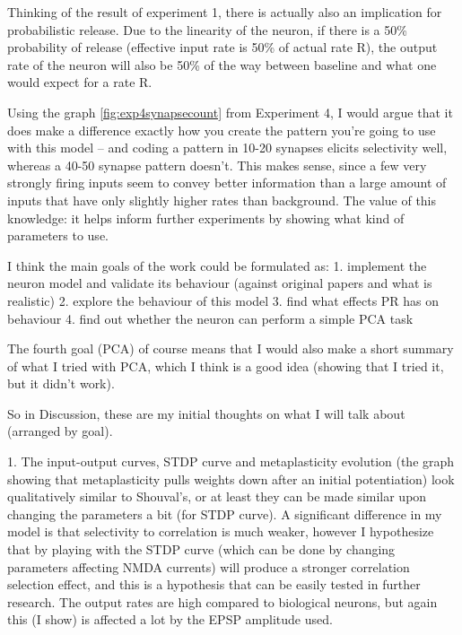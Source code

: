 \documentclass[a4paper,12pt]{report}
\theoremstyle{definition}
\begin{document}
Thinking of the result of experiment 1, there is actually also an implication for probabilistic release. Due to the linearity of the neuron, if there is a 50\% probability of release (effective input rate is 50\% of actual rate R), the output rate of the neuron will also be 50\% of the way between baseline and what one would expect for a rate R.

Using the graph \ref{fig:exp4synapsecount} from Experiment 4, I would argue that it does make a difference exactly how you create the pattern you're going to use with this model -- and coding a pattern in 10-20 synapses elicits selectivity well, whereas a 40-50 synapse pattern doesn't. This makes sense, since a few very strongly firing inputs seem to convey better information than a large amount of inputs that have only slightly higher rates than background.
The value of this knowledge: it helps inform further experiments by showing what kind of parameters to use.







I think the main goals of the work could be formulated as:
1. implement the neuron model and validate its behaviour (against original papers and what is realistic)
2. explore the behaviour of this model
3. find what effects PR has on behaviour
4. find out whether the neuron can perform a simple PCA task

The fourth goal (PCA) of course means that I would also make a short summary of what I tried with PCA, which I think is a good idea (showing that I tried it, but it didn't work).

So in Discussion, these are my initial thoughts on what I will talk about (arranged by goal).

1. The input-output curves, STDP curve and metaplasticity evolution (the graph showing that metaplasticity pulls weights down after an initial potentiation) look qualitatively similar to Shouval's, or at least they can be made similar upon changing the parameters a bit (for STDP curve). A significant difference in my model is that selectivity to correlation is much weaker, however I hypothesize that by playing with the STDP curve (which can be done by changing parameters affecting NMDA currents) will produce a stronger correlation selection effect, and this is a hypothesis that can be easily tested in further research. The output rates are high compared to biological neurons, but again this (I show) is affected a lot by the EPSP amplitude used.
\end{document}
